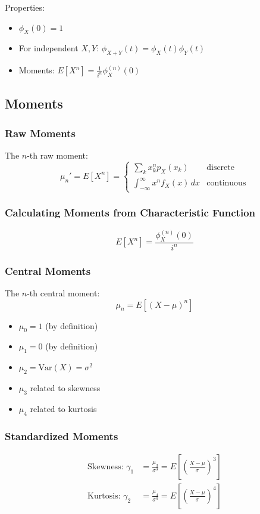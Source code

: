 \documentclass[10pt, twocolumn]{article}
\begin{document}
Properties:
\begin{itemize}
    \item $\phi_X(0) = 1$
    \item For independent $X, Y$: $\phi_{X+Y}(t) = \phi_X(t) \phi_Y(t)$
    \item Moments: $E[X^n] = \frac{1}{i^n} \phi_X^{(n)}(0)$
\end{itemize}

\subsection{Moments}

\subsubsection{Raw Moments}
The $n$-th raw moment:
\[ \mu_n' = E[X^n] = \begin{cases}
        \sum_k x_k^n p_X(x_k)                  & \text{discrete}   \\
        \int_{-\infty}^{\infty} x^n f_X(x)\,dx & \text{continuous}
    \end{cases} \]

\subsubsection{Calculating Moments from Characteristic Function}
\[ E[X^n] = \frac{\phi_X^{(n)}(0)}{i^n} \]

\subsubsection{Central Moments}
The $n$-th central moment:
\[ \mu_n = E[(X-\mu)^n] \]
\begin{itemize}
    \item $\mu_0 = 1$ (by definition)
    \item $\mu_1 = 0$ (by definition)
    \item $\mu_2 = \text{Var}(X) = \sigma^2$
    \item $\mu_3$ related to skewness
    \item $\mu_4$ related to kurtosis
\end{itemize}

\subsubsection{Standardized Moments}
\begin{align}
    \text{Skewness: } \gamma_1 & = \frac{\mu_3}{\sigma^3} = E\left[\left(\frac{X-\mu}{\sigma}\right)^3\right] \\
    \text{Kurtosis: } \gamma_2 & = \frac{\mu_4}{\sigma^4} = E\left[\left(\frac{X-\mu}{\sigma}\right)^4\right]
\end{align}
\end{document}

